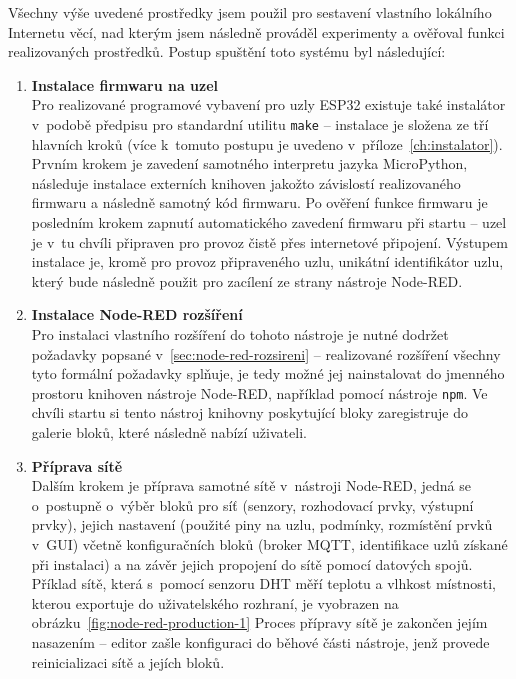 Všechny výše uvedené prostředky jsem použil pro sestavení vlastního lokálního Internetu věcí, nad kterým jsem následně
prováděl experimenty a ověřoval funkci realizovaných prostředků.
Postup spuštění toto systému byl následující:
\begin{enumerate}
    \item \textbf{Instalace firmwaru na uzel} \\
    Pro realizované programové vybavení pro uzly ESP32 existuje také instalátor v~podobě předpisu pro standardní
    utilitu \texttt{make} -- instalace je složena ze tří hlavních kroků (více k~tomuto postupu je uvedeno
    v~příloze~\ref{ch:instalator}).
    Prvním krokem je zavedení samotného interpretu jazyka MicroPython, následuje instalace externích knihoven jakožto
    závislostí realizovaného firmwaru a následně samotný kód firmwaru.
    Po ověření funkce firmwaru je posledním krokem zapnutí automatického zavedení firmwaru při startu -- uzel je v~tu
    chvíli připraven pro provoz čistě přes internetové připojení.
    Výstupem instalace je, kromě pro provoz připraveného uzlu, unikátní identifikátor uzlu, který bude následně použit
    pro zacílení ze strany nástroje Node-RED.

    \item \textbf{Instalace Node-RED rozšíření} \\
    Pro instalaci vlastního rozšíření do tohoto nástroje je nutné dodržet požadavky popsané
    v~\ref{sec:node-red-rozsireni} -- realizované rozšíření všechny tyto formální požadavky splňuje, je tedy možné jej
    nainstalovat do jmenného prostoru knihoven nástroje Node-RED, například pomocí nástroje \texttt{npm}.
    Ve chvíli startu si tento nástroj knihovny poskytující bloky zaregistruje do galerie bloků, které následně nabízí
    uživateli.

    \item \textbf{Příprava sítě} \\
    Dalším krokem je příprava samotné sítě v~nástroji Node-RED, jedná se o~postupně o~výběr bloků pro síť (senzory,
    rozhodovací prvky, výstupní prvky), jejich nastavení (použité piny na uzlu, podmínky, rozmístění prvků v~GUI)
    včetně konfiguračních bloků (broker MQTT, identifikace uzlů získané při instalaci) a na závěr jejich propojení do
    sítě pomocí datových spojů.
    Příklad sítě, která s~pomocí senzoru DHT měří teplotu a vlhkost místnosti, kterou
    exportuje do uživatelského rozhraní, je vyobrazen na obrázku~\ref{fig:node-red-production-1}
    Proces přípravy sítě je zakončen jejím nasazením -- editor zašle konfiguraci do běhové části nástroje, jenž provede
    reinicializaci sítě a jejích bloků.
\end{enumerate}

